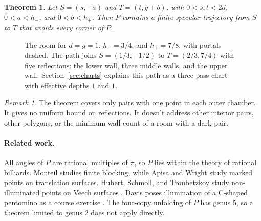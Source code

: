 \documentclass[11pt]{article}
\newtheorem{theorem}{Theorem}
\theoremstyle{remark}
\newtheorem{remark}{Remark}
\begin{document}
\begin{theorem}\label{thm:main}
Let $S=(s,-a)$ and $T=(t,g+b)$, with $0<s,t<2d$, $0<a<h_-$, and $0<b<h_+$. Then $P$ contains a finite specular trajectory from $S$ to $T$ that avoids every corner of $P$.
\end{theorem}

\begin{figure}[ht]
\centering
{}
\caption{The room for $d=g=1$, $h_-=3/4$, and $h_+=7/8$, with portals dashed. The path joins $S=(1/3,-1/2)$ to $T=(2/3,7/4)$ with five reflections: the lower wall, three middle walls, and the upper wall. Section~\ref{sec:charts} explains this path as a three-pass chart with effective depths $1$ and $1$.}
\label{fig:room}
\end{figure}

\begin{remark}
The theorem covers only pairs with one point in each outer chamber. It gives no uniform bound on reflections. It doesn't address other interior pairs, other polygons, or the minimum wall count of a room with a dark pair.
\end{remark}

\paragraph{Related work.} All angles of $P$ are rational multiples of $\pi$, so $P$ lies within the theory of rational billiards. Monteil \cite{Monteil2005} studies finite blocking, while Apisa and Wright \cite{ApisaWright2021} study marked points on translation surfaces. Hubert, Schmoll, and Troubetzkoy study non-illuminated points on Veech surfaces \cite{HST2008}. Davis poses illumination of a C-shaped pentomino as a course exercise \cite{Davis2016}. The four-copy unfolding of $P$ has genus 5, so a theorem limited to genus 2 does not apply directly.
\end{document}
